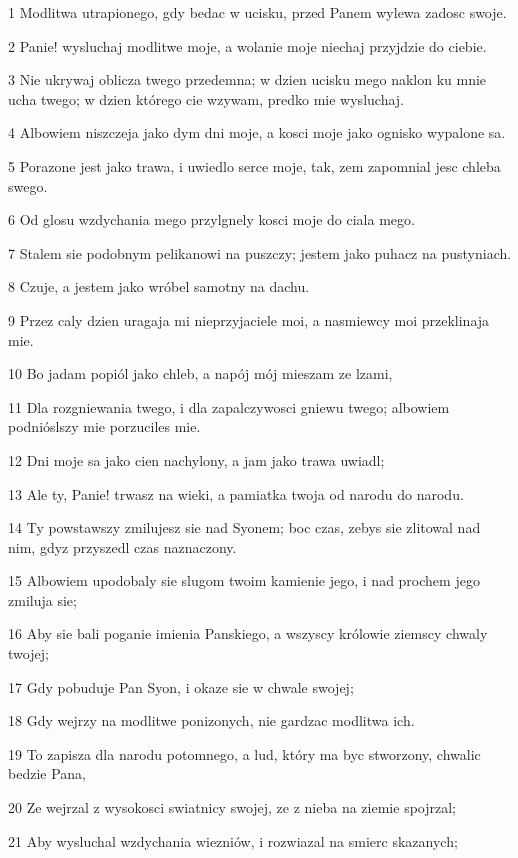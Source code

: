 \par 1 Modlitwa utrapionego, gdy bedac w ucisku, przed Panem wylewa zadosc swoje.
\par 2 Panie! wysluchaj modlitwe moje, a wolanie moje niechaj przyjdzie do ciebie.
\par 3 Nie ukrywaj oblicza twego przedemna; w dzien ucisku mego naklon ku mnie ucha twego; w dzien którego cie wzywam, predko mie wysluchaj.
\par 4 Albowiem niszczeja jako dym dni moje, a kosci moje jako ognisko wypalone sa.
\par 5 Porazone jest jako trawa, i uwiedlo serce moje, tak, zem zapomnial jesc chleba swego.
\par 6 Od glosu wzdychania mego przylgnely kosci moje do ciala mego.
\par 7 Stalem sie podobnym pelikanowi na puszczy; jestem jako puhacz na pustyniach.
\par 8 Czuje, a jestem jako wróbel samotny na dachu.
\par 9 Przez caly dzien uragaja mi nieprzyjaciele moi, a nasmiewcy moi przeklinaja mie.
\par 10 Bo jadam popiól jako chleb, a napój mój mieszam ze lzami,
\par 11 Dla rozgniewania twego, i dla zapalczywosci gniewu twego; albowiem podnióslszy mie porzuciles mie.
\par 12 Dni moje sa jako cien nachylony, a jam jako trawa uwiadl;
\par 13 Ale ty, Panie! trwasz na wieki, a pamiatka twoja od narodu do narodu.
\par 14 Ty powstawszy zmilujesz sie nad Syonem; boc czas, zebys sie zlitowal nad nim, gdyz przyszedl czas naznaczony.
\par 15 Albowiem upodobaly sie slugom twoim kamienie jego, i nad prochem jego zmiluja sie;
\par 16 Aby sie bali poganie imienia Panskiego, a wszyscy królowie ziemscy chwaly twojej;
\par 17 Gdy pobuduje Pan Syon, i okaze sie w chwale swojej;
\par 18 Gdy wejrzy na modlitwe ponizonych, nie gardzac modlitwa ich.
\par 19 To zapisza dla narodu potomnego, a lud, który ma byc stworzony, chwalic bedzie Pana,
\par 20 Ze wejrzal z wysokosci swiatnicy swojej, ze z nieba na ziemie spojrzal;
\par 21 Aby wysluchal wzdychania wiezniów, i rozwiazal na smierc skazanych;
